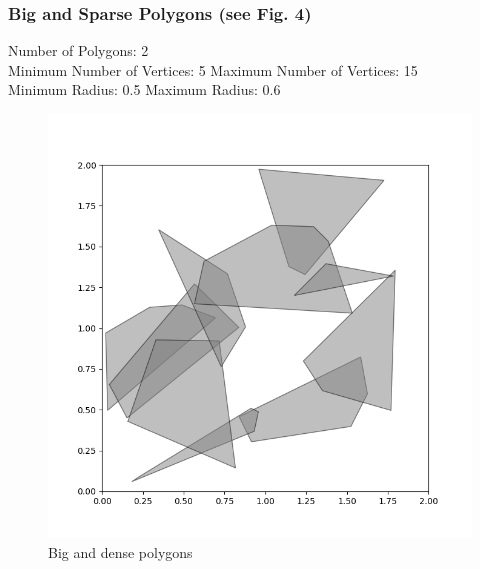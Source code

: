 \documentclass{article}
\begin{document}
\subsubsection{Big and Sparse Polygons (see Fig. 4)}
Number of Polygons: 2
\\Minimum Number of Vertices: 5 \space\space\space\space\space\space\space Maximum Number of Vertices: 15 
\\Minimum Radius: 0.5 \space\space\space\space\space\space\space\space\space\space\space \space\space\space\space\space \space\space \space\space\space Maximum Radius: 0.6
\begin{figure}[htbp]
  \centering
  \begin{minipage}{0.45\textwidth}
    \includegraphics[width=\linewidth]{part1_big_dense.png}
    \caption{Big and dense polygons}
  \end{minipage}\hfill
  \begin{minipage}{0.45\textwidth}

\end{minipage}
\end{figure}
\end{document}

